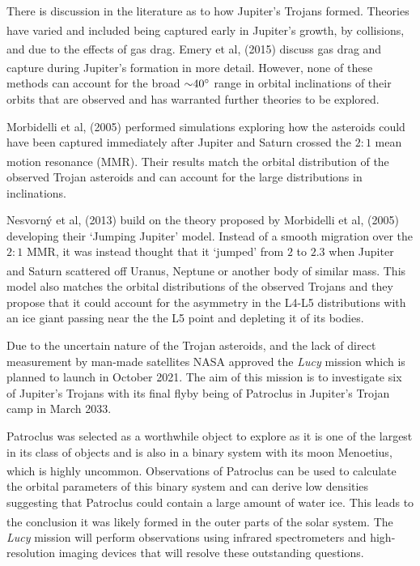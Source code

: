 \documentclass[10pt, twocolumn]{revtex4}    %
\newcommand{\scite}[1]{\textsuperscript{\cite{#1}}}
\begin{document}
There is discussion in the literature as to how Jupiter's Trojans formed. Theories have varied and included being captured early in Jupiter's growth,\scite{FlemingoriginTrojanasteroids2000} by collisions,\scite{ShoemakerTrojanasteroidsPopulations1989} and due to the effects of gas drag.\scite{KortenkampCaptureTrojanAsteroids2001} Emery et al, (2015) discuss gas drag and capture during Jupiter's formation in more detail.\textsuperscript{\cite{EmeryComplexHistoryTrojan2015}} However, none  of these methods can account for the broad ${\sim}40\degree$ range in orbital inclinations of their orbits that are observed and has warranted further theories to be explored.

Morbidelli et al, (2005) performed simulations exploring how the asteroids could have been captured immediately after Jupiter and Saturn crossed the $2{:}1$ mean motion resonance (MMR).\textsuperscript{\cite{MorbidelliChaoticcaptureJupiter2005a}} Their results match the orbital distribution of the observed Trojan asteroids and can account for the large distributions in inclinations.
 
Nesvorn\'y et al, (2013) build on the theory proposed by Morbidelli et al, (2005) developing their `Jumping Jupiter' model. Instead of a smooth migration over the $2{:}1$ MMR, it was instead thought that it `jumped' from $2$ to $2.3$ when Jupiter and Saturn scattered off Uranus, Neptune or another body of similar mass.\scite{NesvornyCaptureTrojansJumping2013} This model also matches the orbital distributions of the observed Trojans and they propose that it could account for the asymmetry in the L4-L5 distributions with an ice giant passing near the the L5 point and depleting it of its bodies.

Due to the uncertain nature of the Trojan asteroids, and the lack of direct measurement by man-made satellites NASA approved the \textit{Lucy} mission which is planned to launch in October 2021. The aim of this mission is to investigate six of Jupiter's Trojans with its final flyby being of Patroclus in Jupiter's Trojan camp in March 2033. 

Patroclus was selected as a worthwhile object to explore as it is one of the largest in its class of objects and is also in a binary system with its moon Menoetius, which is highly uncommon.\scite{BuieSIZESHAPESTELLAR2015} Observations of Patroclus can be used to calculate the orbital parameters of this binary system and can derive low densities suggesting that Patroclus could contain a large amount of water ice. This leads to the conclusion it was likely formed in the outer parts of the solar system.\scite{Marchislowdensity8gcm32006}\scite{YangSpectroscopicSearchWater2006} The \textit{Lucy} mission will perform observations using infrared spectrometers and high-resolution imaging devices that will resolve these outstanding questions. 
\end{document}
